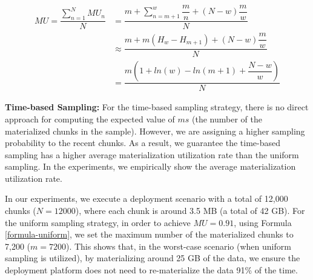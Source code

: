 \begin{equation} \label{formula-window-based}
\begin{aligned}
MU=\dfrac{\sum\limits_{n=1}^N MU_n}{N}
&=\dfrac{m + \sum\limits_{n = m+1}^{w} \dfrac{m}{n} + (N-w)\dfrac{m}{w} }{N} \\
&\approx\dfrac{m  +  m (H_w - H_{m+1}) + (N-w)\dfrac{m}{w}}{N}\\
&=\dfrac{m(1 + ln(w) - ln(m+1) + \dfrac{N-w}{w})}{N}
\end{aligned}
\end{equation}

\textbf{Time-based Sampling:}
For the time-based sampling strategy, there is no direct approach for computing the expected value of $ms$ (the number of the materialized chunks in the sample).
However, we are assigning a higher sampling probability to the recent chunks.
As a result, we guarantee the time-based sampling has a higher average materialization utilization rate than the uniform sampling.
In the experiments, we empirically show the average materialization utilization rate.

In our experiments, we execute a deployment scenario with a total of 12,000 chunks ($N = 12000$), where each chunk is around 3.5 MB (a total of 42 GB).
For the uniform sampling strategy, in order to achieve $MU = 0.91$, using Formula \ref{formula-uniform}, we set the maximum number of the materialized chunks to 7,200 ($m=7200$).
This shows that, in the worst-case scenario (when uniform sampling is utilized), by materializing around 25 GB of the data, we ensure the deployment platform does not need to re-materialize the data 91\% of the time.



